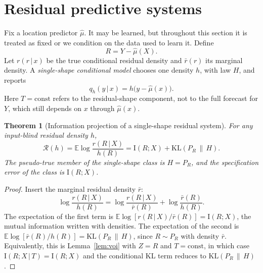 \documentclass[11pt]{article}
\newtheorem{theorem}{Theorem}
\theoremstyle{remark}
\newcommand{\E}{\mathbb{E}}
\newcommand{\KL}{\mathrm{KL}}
\newcommand{\I}{\mathrm{I}}
\newcommand{\given}{\,|\,}
\newcommand{\Reg}{\mathcal{R}}
\begin{document}
\section{Residual predictive systems}\label{sec:residual}

Fix a location predictor $\hat\mu$. It may be learned, but throughout this section it is treated
as fixed or we condition on the data used to learn it. Define
\[
R=Y-\hat\mu(X).
\]
Let $r(r\given x)$ be the true conditional residual density and $\bar r(r)$ its marginal density.
A \emph{single-shape conditional model} chooses one density $h$, with law $H$, and reports
\[
q_h(y\given x)=h\big(y-\hat\mu(x)\big).
\]
Here $T=\mathrm{const}$ refers to the residual-shape component, not to the full forecast for
$Y$, which still depends on $x$ through $\hat\mu(x)$.

\begin{theorem}[Information projection of a single-shape residual system]\label{prop:residual}
For any input-blind residual density $h$,
\begin{equation}\label{eq:residual}
\Reg(h)=\E\log\frac{r(R\given X)}{h(R)}
=\I(R;X)+\KL(P_R\,\|\,H).
\end{equation}
The pseudo-true member of the single-shape class is $H=P_R$, and the specification error of the
class is $\I(R;X)$.
\end{theorem}

\begin{proof}
Insert the marginal residual density $\bar r$:
\[
\log\frac{r(R\given X)}{h(R)}
=\log\frac{r(R\given X)}{\bar r(R)}+\log\frac{\bar r(R)}{h(R)}.
\]
The expectation of the first term is $\E\log[r(R\given X)/\bar r(R)]=\I(R;X)$, the
mutual information written with densities. The expectation of the second is
$\E\log[\bar r(R)/h(R)]=\KL(P_R\,\|\,H)$, since $R\sim P_R$ with density $\bar r$.
Equivalently, this is Lemma~\ref{lem:voi} with $Z=R$ and $T=\mathrm{const}$, in which case
$\I(R;X\given T)=\I(R;X)$ and the conditional KL term reduces to $\KL(P_R\,\|\,H)$.
\end{proof}
\end{document}
